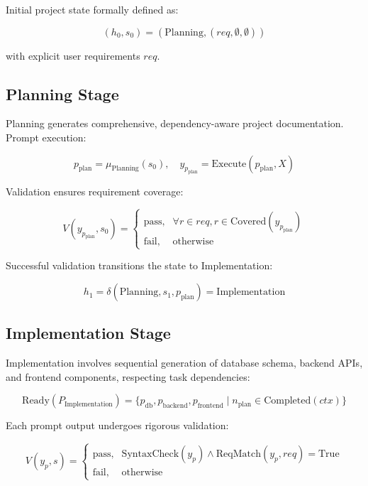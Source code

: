 \documentclass[11pt,a4paper]{article}
\begin{document}
Initial project state formally defined as:

\[
(h_0, s_0) = (\text{Planning}, (req, \emptyset, \emptyset))
\]

with explicit user requirements \(req\).

\subsection{Planning Stage}
\label{subsec:planning_stage}

Planning generates comprehensive, dependency-aware project documentation. Prompt execution:

\[
p_{\text{plan}} = \mu_{\text{Planning}}(s_0),\quad y_{p_{\text{plan}}} = \text{Execute}(p_{\text{plan}}, X)
\]

Validation ensures requirement coverage:

\[
V(y_{p_{\text{plan}}}, s_0)=
\begin{cases}
    \text{pass}, & \forall r\in req, r\in\text{Covered}(y_{p_{\text{plan}}})\\[4pt]
    \text{fail}, & \text{otherwise}
\end{cases}
\]

Successful validation transitions the state to Implementation:

\[
h_1=\delta(\text{Planning},s_1,p_{\text{plan}})=\text{Implementation}
\]

\subsection{Implementation Stage}
\label{subsec:implementation_stage}

Implementation involves sequential generation of database schema, backend APIs, and frontend components, respecting task dependencies:

\[
\text{Ready}(P_{\text{Implementation}})=\{p_{\text{db}},p_{\text{backend}},p_{\text{frontend}}\mid n_{\text{plan}}\in\text{Completed}(ctx)\}
\]

Each prompt output undergoes rigorous validation:

\[
V(y_{p}, s)=
\begin{cases}
    \text{pass}, & \text{SyntaxCheck}(y_{p})\wedge\text{ReqMatch}(y_{p}, req)=\text{True}\\[4pt]
    \text{fail}, & \text{otherwise}
\end{cases}
\]
\end{document}
